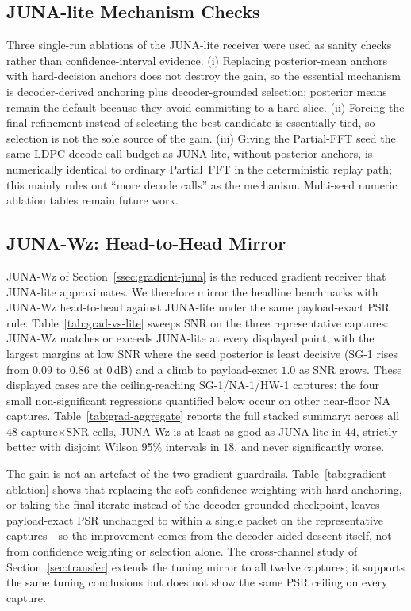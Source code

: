 \documentclass[journal]{IEEEtran}
\newcommand{\junalite}{JUNA-lite}
\newcommand{\junawz}{JUNA-Wz}
\begin{document}
\subsection{\texorpdfstring{\junalite{}}{JUNA-lite} Mechanism Checks}
Three single-run ablations of the \junalite{} receiver were used as sanity checks
rather than confidence-interval evidence. (i) Replacing posterior-mean anchors with
hard-decision anchors does not destroy the gain, so the essential mechanism is
decoder-derived anchoring plus decoder-grounded selection; posterior means remain
the default because they avoid committing to a hard slice. (ii) Forcing the final
refinement instead of selecting the best candidate is essentially tied, so
selection is not the sole source of the gain. (iii) Giving the Partial-FFT seed
the same LDPC decode-call budget as \junalite{}, without posterior anchors, is
numerically identical to ordinary Partial~FFT in the deterministic replay path;
this mainly rules out ``more decode calls'' as the mechanism. Multi-seed numeric
ablation tables remain future work.

\subsection{\texorpdfstring{\junawz{}}{JUNA-Wz}: Head-to-Head Mirror}
\label{ssec:gradient-mirror}\label{ssec:gradient-ablation}
\junawz{} of Section~\ref{ssec:gradient-juna} is the reduced gradient receiver
that \junalite{} approximates. We therefore mirror the headline benchmarks with
\junawz{} head-to-head against \junalite{} under the same payload-exact PSR rule.
Table~\ref{tab:grad-vs-lite} sweeps SNR on the three representative captures:
\junawz{} matches or exceeds \junalite{} at every displayed point, with the
largest margins at low SNR where the seed posterior is least decisive (SG-1
rises from $0.09$ to $0.86$ at $0$\,dB) and a climb to payload-exact $1.0$ as SNR
grows. These displayed cases are the ceiling-reaching SG-1/NA-1/HW-1 captures;
the four small non-significant regressions quantified below occur on other
near-floor NA captures. Table~\ref{tab:grad-aggregate} reports the full stacked
summary: across all $48$ capture$\times$SNR cells, \junawz{} is at least as good
as \junalite{} in $44$, strictly better with disjoint Wilson 95\% intervals in
$18$, and never significantly worse.

The gain is not an artefact of the two gradient guardrails.
Table~\ref{tab:gradient-ablation} shows that replacing the soft confidence
weighting with hard anchoring, or taking the final iterate instead of the
decoder-grounded checkpoint, leaves payload-exact PSR unchanged to within a single
packet on the representative captures---so the improvement comes from the
decoder-aided descent itself, not from confidence weighting or selection alone.
The cross-channel study of Section~\ref{sec:transfer} extends the tuning mirror
to all twelve captures; it supports the same tuning conclusions but does not
show the same PSR ceiling on every capture.
\end{document}
